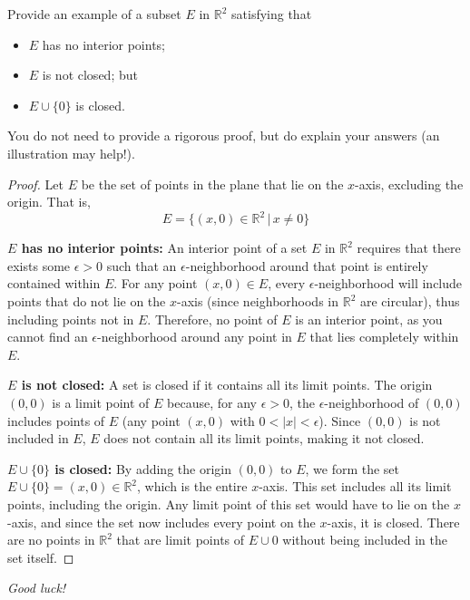 \documentclass[10pt]{article}
\newcommand{\R}{\mathbb{R}}
\newenvironment{problem}[2][Problem]{\begin{trivlist}
\item[\hskip \labelsep {\bfseries #1}\hskip \labelsep {\bfseries #2.}]}{\end{trivlist}}
\begin{document}
\newpage
\begin{problem}{5}
	Provide an example of a subset $ E $ in $ \R^2 $ satisfying that 
	\begin{itemize}
		\item $ E $ has no interior points;
		\item $ E $ is not closed; but
		\item $ E \cup \{0\} $ is closed.
	\end{itemize}
	You do not need to provide a rigorous proof, but do explain your answers (an illustration may help!).

    \begin{proof}
        Let $E$ be the set of points in the plane that lie on the $x$-axis, excluding the origin. That is,
        $$E = \{(x, 0) \in \R^2 \, \vert \, x \neq 0\}$$

        \textbf{$E$ has no interior points:}
        An interior point of a set $E$ in $\mathbb{R}^2$ requires that there exists some $\epsilon > 0$ such that an $\epsilon$-neighborhood around that point is entirely contained within $E$. For any point $(x, 0) \in E$, every $\epsilon$-neighborhood will include points that do not lie on the $x$-axis (since neighborhoods in $\mathbb{R}^2$ are circular), thus including points not in $E$. Therefore, no point of $E$ is an interior point, as you cannot find an $\epsilon$-neighborhood around any point in $E$ that lies completely within $E$.

        \textbf{$E$ is not closed:}
        A set is closed if it contains all its limit points. The origin $(0,0)$ is a limit point of $E$ because, for any $\epsilon > 0$, the $\epsilon$-neighborhood of $(0,0)$ includes points of $E$ (any point $(x,0)$ with $0 < |x| < \epsilon$). Since $(0,0)$ is not included in $E$, $E$ does not contain all its limit points, making it not closed.

        \textbf{$E \cup \{0\}$ is closed:}
        By adding the origin $(0,0)$ to $E$, we form the set $E \cup \{0\} = {(x, 0) \in \mathbb{R}^2}$, which is the entire $x$-axis. This set includes all its limit points, including the origin. Any limit point of this set would have to lie on the $x$-axis, and since the set now includes every point on the $x$-axis, it is closed. There are no points in $\mathbb{R}^2$ that are limit points of $E \cup {0}$ without being included in the set itself.

    \end{proof}
\end{problem}


\vspace{1cm}\hfill \emph{Good luck!}
\end{document}
